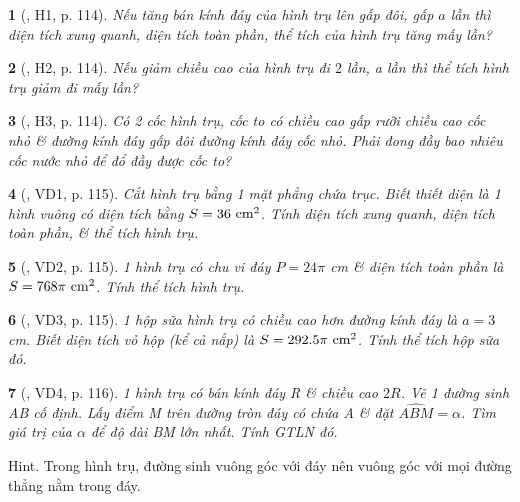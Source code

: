 \documentclass{article}
\newtheorem{baitoan}{}
\begin{document}
\begin{baitoan}[\cite{Binh_boi_duong_Toan_9_tap_2}, H1, p. 114]
	Nếu tăng bán kính đáy của hình trụ lên gấp đôi, gấp $a$ lần thì diện tích xung quanh, diện tích toàn phần, thể tích của hình trụ tăng mấy lần?
\end{baitoan}

\begin{baitoan}[\cite{Binh_boi_duong_Toan_9_tap_2}, H2, p. 114]
	Nếu giảm chiều cao của hình trụ đi $2$ lần, a lần thì thể tích hình trụ giảm đi mấy lần?
\end{baitoan}

\begin{baitoan}[\cite{Binh_boi_duong_Toan_9_tap_2}, H3, p. 114]
	Có 2 cốc hình trụ, cốc to có chiều cao gấp rưỡi chiều cao cốc nhỏ \& đường kính đáy gấp đôi đường kính đáy cốc nhỏ. Phải đong đầy bao nhiêu cốc nước nhỏ để đổ đầy được cốc to?
\end{baitoan}

\begin{baitoan}[\cite{Binh_boi_duong_Toan_9_tap_2}, VD1, p. 115]
	Cắt hình trụ bằng 1 mặt phẳng chứa trục. Biết thiết diện là 1 hình vuông có diện tích bằng $S = 36\ {\rm cm}^2$. Tính diện tích xung quanh, diện tích toàn phần, \& thể tích hình trụ.
\end{baitoan}

\begin{baitoan}[\cite{Binh_boi_duong_Toan_9_tap_2}, VD2, p. 115]
	1 hình trụ có chu vi đáy $P = 24\pi$ {\rm cm} \& diện tích toàn phần là $S = 768\pi\ {\rm cm}^2$. Tính thể tích hình trụ.
\end{baitoan}

\begin{baitoan}[\cite{Binh_boi_duong_Toan_9_tap_2}, VD3, p. 115]
	1 hộp sữa hình trụ có chiều cao hơn đường kính đáy là $a = 3$ {\rm cm}. Biết diện tích vỏ hộp (kể cả nắp) là $S = 292.5\pi\ {\rm cm}^2$. Tính thể tích hộp sữa đó.
\end{baitoan}

\begin{baitoan}[\cite{Binh_boi_duong_Toan_9_tap_2}, VD4, p. 116]
	1 hình trụ có bán kính đáy R \& chiều cao $2R$. Vẽ 1 đường sinh AB cố định. Lấy điểm M trên đường tròn đáy có chứa A \& đặt $\widehat{ABM} = \alpha$. Tìm giá trị của $\alpha$ để độ dài BM lớn nhất. Tính {\rm GTLN} đó.
\end{baitoan}
{\sf Hint.} Trong hình trụ, đường sinh vuông góc với đáy nên vuông góc với mọi đường thẳng nằm trong đáy.
\end{document}

